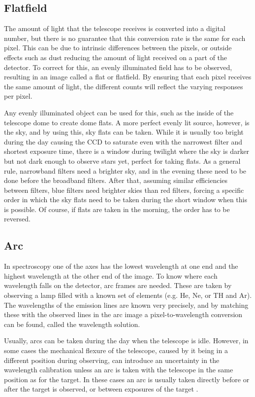 \documentclass[a4paper,oneside,12pt, class=Latex/Classes/PhDthesisPSnPDF, crop=false]{standalone}
\begin{document}
\subsection{Flatfield}
The amount of light that the telescope receives is converted into a digital number, but there is no guarantee that this conversion rate is the same for each pixel. This can be due to intrinsic differences between the pixels, or outside effects such as dust reducing the amount of light received on a part of the detector. To correct for this, an evenly illuminated field has to be observed, resulting in an image called a flat or flatfield. By ensuring that each pixel receives the same amount of light, the different counts will reflect the varying responses per pixel.

Any evenly illuminated object can be used for this, such as the inside of the telescope dome to create dome flats. A more perfect evenly lit source, however, is the sky, and by using this, sky flats can be taken. While it is usually too bright during the day causing the CCD to saturate even with the narrowest filter and shortest exposure time, there is a window during twilight where the sky is darker but not dark enough to observe stars yet, perfect for taking flats. As a general rule, narrowband filters need a brighter sky, and in the evening these need to be done before the broadband filters. After that, assuming similar efficiencies between filters, blue filters need brighter skies than red filters, forcing a specific order in which the sky flats need to be taken during the short window when this is possible. Of course, if flats are taken in the morning, the order has to be reversed.


\subsection{Arc}
In spectroscopy one of the axes has the lowest wavelength at one end and the highest wavelength at the other end of the image. To know where each wavelength falls on the detector, arc frames are needed. These are taken by observing a lamp filled with a known set of elements (e.g. He, Ne, or TH and Ar). The wavelengths of the emission lines are known very precisely, and by matching these with the observed lines in the arc image a pixel-to-wavelength conversion can be found, called the wavelength solution.

Usually, arcs can be taken during the day when the telescope is idle. However, in some cases the mechanical flexure of the telescope, caused by it being in a different position during observing, can introduce an uncertainty in the wavelength calibration unless an arc is taken with the telescope in the same position as for the target. In these cases an arc is usually taken directly before or after the target is observed, or between exposures of the target \citep{CCD_handbook}.
\end{document}

